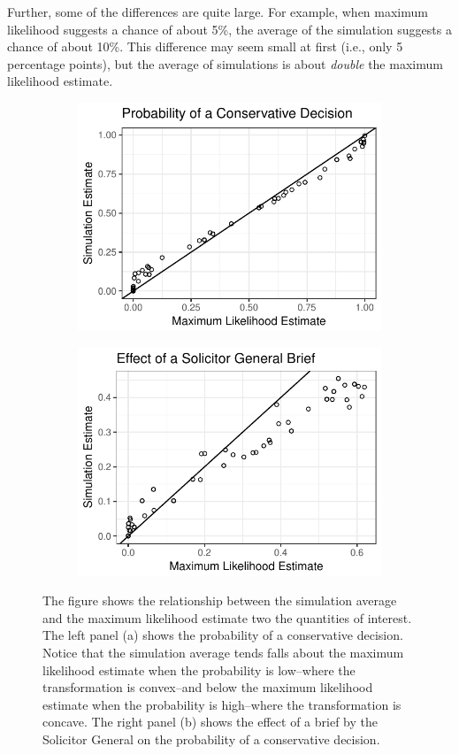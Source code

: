 \documentclass[10pt]{article}
\begin{document}
Further, some of the differences are quite large.
For example, when maximum likelihood suggests a chance of about 5\%, the average of the simulation suggests a chance of about 10\%. 
This difference may seem small at first (i.e., only 5 percentage points), but the average of simulations is about \textit{double} the maximum likelihood estimate. 


\begin{figure}
\begin{subfigure}{.5\textwidth}
  \centering
  \includegraphics[width=.8\linewidth]{figs/ge-pr.pdf}
  \caption{}
  \label{fig:ge1}
\end{subfigure}%
\begin{subfigure}{.5\textwidth}
  \centering
  \includegraphics[width=.8\linewidth]{figs/ge-fd.pdf}
  \caption{}
  \label{fig:ge2}
\end{subfigure}
\caption{The figure shows the relationship between the simulation average and the maximum likelihood estimate two the quantities of interest. The left panel (a) shows the probability of a conservative decision. Notice that the simulation average tends falls about the maximum likelihood estimate when the probability is low--where the transformation is convex--and below the maximum likelihood estimate when the probability is high--where the transformation is concave. The right panel (b) shows the effect of a brief by the Solicitor General on the probability of a conservative decision.}
\label{fig:ge}
\end{figure}
\end{document}

